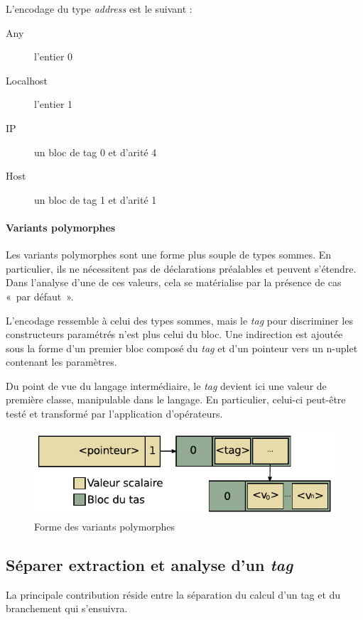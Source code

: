 L'encodage du type \emph{address} est le suivant :
\begin{description}
  \item[Any] l'entier 0
  \item[Localhost] l'entier 1
  \item[IP] un bloc de tag 0 et d'arité 4
  \item[Host] un bloc de tag 1 et d'arité 1
\end{description}

\paragraph{Variants polymorphes} 
Les variants polymorphes sont une forme plus souple de types sommes. En
particulier, ils ne nécessitent pas de déclarations préalables et peuvent
s'étendre. Dans l'analyse d'une de ces valeurs, cela se matérialise par la
présence de cas « par défaut ».

L'encodage ressemble à celui des types sommes, mais le \emph{tag} pour
discriminer les constructeurs paramétrés n'est plus celui du bloc. Une
indirection est ajoutée sous la forme d'un premier bloc composé du \emph{tag}
et d'un pointeur vers un n-uplet contenant les paramètres.

Du point de vue du langage intermédiaire, le \emph{tag} devient ici une valeur
de première classe, manipulable dans le langage.  En particulier, celui-ci
peut-être testé et transformé par l'application d'opérateurs.

\begin{figure}
\centering
\includegraphics{media/ocaml_variant}
\caption{Forme des variants polymorphes}
\end{figure}

\subsection{Séparer extraction et analyse d'un \emph{tag}}

La principale contribution réside entre la séparation du calcul d'un tag et du
branchement qui s'ensuivra.

